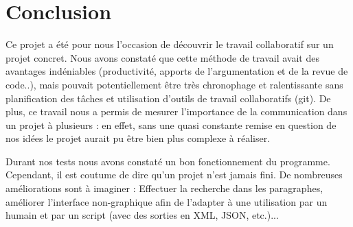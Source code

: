 \section*{Conclusion}

Ce projet a été pour nous l'occasion de découvrir le travail collaboratif sur un projet concret. Nous avons constaté que cette méthode de travail avait des avantages indéniables (productivité, apports de l'argumentation et de la revue de code..), mais pouvait potentiellement être très chronophage et ralentissante sans planification des tâches et utilisation d'outils de travail collaboratifs (git). 
De plus, ce travail nous a permis de mesurer l'importance de la communication dans un projet à plusieurs : en effet, sans une quasi constante remise en question de nos idées le projet aurait pu être bien plus complexe à réaliser. 

Durant nos tests nous avons constaté un bon fonctionnement du programme. Cependant, il est coutume de dire qu'un projet n'est jamais fini.
De nombreuses améliorations sont à imaginer : Effectuer la recherche dans les paragraphes, améliorer l'interface non-graphique afin de l'adapter à une utilisation par un humain et par un script (avec des sorties en XML, JSON, etc.)...